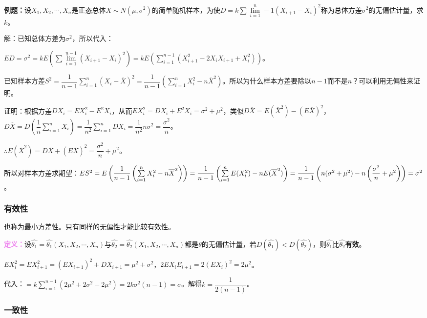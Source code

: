 \documentclass[UTF8, 12pt]{ctexart}
\begin{document}
\textbf{例题：}设$X_1,X_2,\cdots,X_n$是正态总体$X\sim N(\mu,\sigma^2)$的简单随机样本，为使$D=k\sum\lim\limits_{i=1}^n-1(X_{i+1}-X_i)^2$称为总体方差$\sigma^2$的无偏估计量，求$k$。

解：已知总体方差为$\sigma^2$，所以代入：

$ED=\sigma^2=kE(\sum\lim\limits_{i=1}^{n-1}(X_{i+1}-X_i)^2)=kE(\sum\limits_{i=1}^{n-1}(X_{i+1}^2-2X_iX_{i+1}+X_i^2))$。

已知样本方差$S^2=\dfrac{1}{n-1}\sum\limits_{i=1}^n(X_i-\overline{X})^2=\dfrac{1}{n-1}\left(\sum\limits_{i=1}^nX_i^2-n\overline{X}^2\right)$。所以为什么样本方差要除以$n-1$而不是$n$？可以利用无偏性来证明。

证明：根据方差$DX_i=EX_i^2-E^2X_i$，从而$EX_i^2=DX_i+E^2X_i=\sigma^2+\mu^2$，类似$D\overline{X}=E(\overline{X}^2)-(E\overline{X})^2$，$D\overline{X}=D\left(\dfrac{1}{n}\sum\limits_{i=1}^nX_i\right)=\dfrac{1}{n^2}\sum\limits_{i=1}^nDX_i=\dfrac{1}{n^2}n\sigma^2=\dfrac{\sigma^2}{n}$。

$\therefore E(\overline{X}^2)=D\overline{X}+(E\overline{X})^2=\dfrac{\sigma^2}{n}+\mu^2$。

所以对样本方差求期望：$ES^2=E\left(\dfrac{1}{n-1}\left(\sum\limits_{i=1}^nX_i^2-n\overline{X}^2\right)\right)=\dfrac{1}{n-1}\\\left(\sum\limits_{i=1}^nE(X_i^2)-nE(\overline{X}^2)\right)=\dfrac{1}{n-1}\left(n(\sigma^2+\mu^2)-n\left(\dfrac{\sigma^2}{n}+\mu^2\right)\right)=\sigma^2$。

\subsubsection{有效性}

也称为最小方差性。只有同样的无偏性才能比较有效性。

\textcolor{violet}{\textbf{定义：}}设$\hat{\theta_1}=\hat{\theta_1}(X_1,X_2,\cdots,X_n)$与$\hat{\theta_2}=\hat{\theta_2}(X_1,X_2,\cdots,X_n)$都是$\theta$的无偏估计量，若$D(\hat{\theta_1})<D(\hat{\theta_2})$，则$\hat{\theta_1}$比$\hat{\theta_2}$\textbf{有效}。

$EX_i^2=EX_{i+1}^2=(EX_{i+1})^2+DX_{i+1}=\mu^2+\sigma^2$，$2EX_iE_{i+1}=2(EX_i)^2=2\mu^2$。

代入：$=k\sum\limits_{i=1}^{n-1}(2\mu^2+2\sigma^2-2\mu^2)=2k\sigma^2(n-1)=\sigma$。解得$k=\dfrac{1}{2(n-1)}$。

\subsubsection{一致性}
\end{document}
